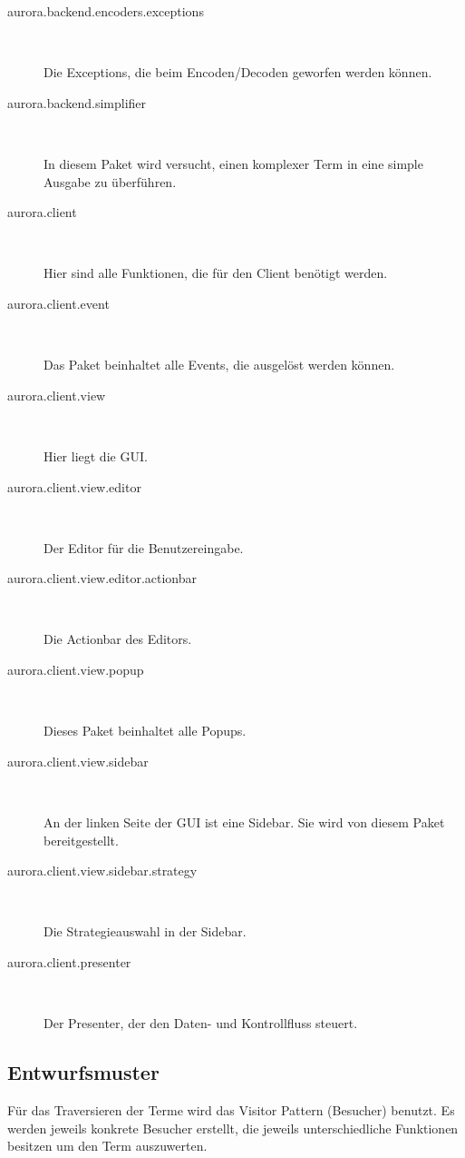 \documentclass[parskip=full,11pt,twoside]{scrbook}
\begin{document}
\begin{description}
	\item[aurora.backend.encoders.exceptions] ~\par
	Die Exceptions, die beim Encoden/Decoden geworfen werden können.
	
	\item[aurora.backend.simplifier] ~\par
	In diesem Paket wird versucht, einen komplexer Term in eine simple Ausgabe zu überführen.
	
	\item[aurora.client] ~\par
	Hier sind alle Funktionen, die für den Client benötigt werden.
	
	\item[aurora.client.event] ~\par
	Das Paket beinhaltet alle Events, die ausgelöst werden können.
	
	\item[aurora.client.view] ~\par
	Hier liegt die GUI.
	
	\item[aurora.client.view.editor] ~\par
	Der Editor für die Benutzereingabe.
	
	\item[aurora.client.view.editor.actionbar] ~\par
	Die Actionbar des Editors.
	
	\item[aurora.client.view.popup] ~\par
	Dieses Paket beinhaltet alle Popups.
	
	\item[aurora.client.view.sidebar] ~\par
	An der linken Seite der GUI ist eine Sidebar.
	Sie wird von diesem Paket bereitgestellt.
	
	\item[aurora.client.view.sidebar.strategy] ~\par 
	Die Strategieauswahl in der Sidebar.
	
	\item[aurora.client.presenter] ~\par
	Der Presenter, der den Daten- und Kontrollfluss steuert.
	
\end{description}


\subsection{Entwurfsmuster}
Für das Traversieren der Terme wird das Visitor Pattern (Besucher) benutzt. Es werden jeweils konkrete Besucher erstellt, die jeweils unterschiedliche Funktionen besitzen um den Term auszuwerten.
\end{document}
